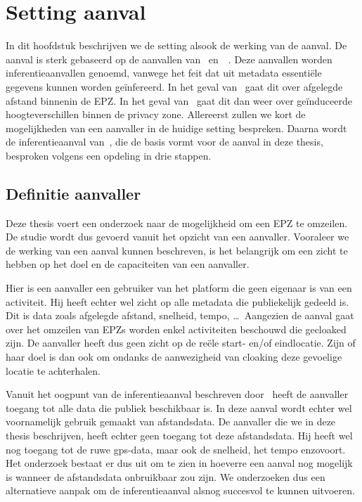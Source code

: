 
\chapter{Setting aanval}\label{chap:inferentieaanval}
In dit hoofdstuk beschrijven we de setting alsook de werking van de aanval. De
aanval is sterk gebaseerd op de aanvallen van~\citeauthor{Dhondt}
en~\citeauthor{Verdonck_2022}~\cite{Verdonck_2022, Dhondt}. Deze aanvallen
worden inferentieaanvallen genoemd, vanwege het feit dat uit metadata
essentiële gegevens kunnen worden geïnfereerd. In het geval
van~\citeauthor{Dhondt} gaat dit over afgelegde afstand binnenin de \ac{EPZ}.
In het geval van~\citeauthor{Verdonck_2022} gaat dit dan weer over geïnduceerde
hoogteverschillen binnen de privacy zone. Allereerst zullen we kort de
mogelijkheden van een aanvaller in de huidige setting bespreken. Daarna wordt
de inferentieaanval van~\citeauthor{Dhondt}, die de basis vormt voor de aanval
in deze thesis, besproken volgens een opdeling in drie stappen.

\section{Definitie aanvaller}\label{sec:definitie-aanvaller}
Deze thesis voert een onderzoek naar de mogelijkheid om een \ac{EPZ} te
omzeilen. De studie wordt dus gevoerd vanuit het opzicht van een aanvaller.
Vooraleer we de werking van een aanval kunnen beschreven, is het belangrijk om
een zicht te hebben op het doel en de capaciteiten van een aanvaller.

Hier is een aanvaller een gebruiker van het platform die geen eigenaar is van
een activiteit. Hij heeft echter wel zicht op alle metadata die publiekelijk
gedeeld is. Dit is data zoals afgelegde afstand, snelheid, tempo, \ldots \
Aangezien de aanval gaat over het omzeilen van \acp{EPZ} worden enkel
activiteiten beschouwd die gecloaked zijn. De aanvaller heeft dus geen zicht op
de reële start- en/of eindlocatie. Zijn of haar doel is dan ook om ondanks de
aanwezigheid van cloaking deze gevoelige locatie te achterhalen.

Vanuit het oogpunt van de inferentieaanval beschreven door~\citeauthor{Dhondt}
heeft de aanvaller toegang tot alle data die publiek beschikbaar is. In deze
aanval wordt echter wel voornamelijk gebruik gemaakt van afstandsdata. De
aanvaller die we in deze thesis beschrijven, heeft echter geen toegang tot deze
afstandsdata. Hij heeft wel nog toegang tot de ruwe gps-data, maar ook de
snelheid, het tempo enzovoort. Het onderzoek bestaat er dus uit om te zien in
hoeverre een aanval nog mogelijk is wanneer de afstandsdata onbruikbaar zou
zijn. We onderzoeken dus een alternatieve aanpak om de inferentieaanval alsnog
succesvol te kunnen uitvoeren.

